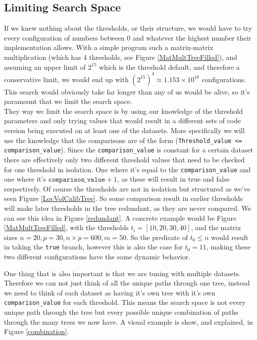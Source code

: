 \subsection{Limiting Search Space}
If we knew nothing about
the thresholds, or their structure, we would have to try every configuration of
numbers between 0 and whatever the highest number their implementation allows. 
With a simple program such a matrix-matrix multiplication (which has 4 thresholds, see Figure \ref{MatMultTreeFilled}), and assuming an upper limit of $2^{15}$ which is the threshold default, and therefore a conservative limit,
we would end up with $\left(2^{15}\right)^4 \approx 1.153\times10^{18}$ configurations.
This search would obviously take far longer than any of us would be alive, so
it's paramount that we  limit the search space.
\\
They way we limit the search space is by using our knowledge of the threshold
parameters and only trying values that would result in a different sets of code 
version being executed on at least one of the datasets. More specifically we will
use the knowledge that the comparisons are of the form
(\texttt{Threshold\_value <= comparison\_value}). Since the
\texttt{comparison\_value} is constant for a certain dataset there are effectively
only two different threshold values that need to be checked for one threshold 
in isolation. One where it's equal to the \texttt{comparison\_value} and one
where it's $\texttt{comparison\_value} + 1$, as these will result in true and
false respectively.
Of course the thresholds are not in isolation but structured as we've seen
Figure \ref{LocVolCalibTree}. So some comparison result in earlier 
thresholds will make later thresholds in the tree redundant, as they are never
compared. We can see this idea in Figure \ref{redundant}. A concrete example
would be Figure \ref{MatMultTreeFilled}, with the thresholds $t_i = [10, 20,
30, 40]$, and the matrix sizes $n=20, p=30, n\times p=600, m=50$. So the
predicate of $t_0 \leq n$ would result in taking the \texttt{true} branch,
however this is also the case for $t_0 = 11$, making these two different
configurations have the same dynamic behavior.

One thing that is also important is that we are tuning with multiple datasets.
Therefore we can not just think of all the unique paths through one tree, instead we
need to think of each dataset as having it's own tree with it's own 
\texttt{comparison\_value} for each threshold. This means the search space is
not every unique path through the tree but every possible unique combination
of paths through the many trees we now have.
A visual example is show, and explained, in Figure \ref{combination}. 


